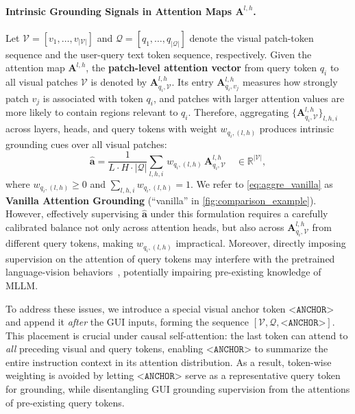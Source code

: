 \paragraph{Intrinsic Grounding Signals in Attention Maps $\mathbf{A}^{l,h}$.}
Let $\mathcal{V}=[v_1,\ldots,v_{|\mathcal{V}|}]$ and $\mathcal{Q}=[q_1,\ldots,q_{|\mathcal{Q}|}]$ denote the visual patch-token sequence and the user-query text token sequence, respectively. 
Given the attention map $\mathbf{A}^{l,h}$, the \textbf{patch-level attention vector} from query token $q_i$ to all visual patches $\mathcal{V}$ is denoted by $\mathbf{A}^{l,h}_{q_i,\mathcal{V}}$. Its entry $\mathbf{A}^{l,h}_{q_i,v_j}$ measures how strongly patch $v_j$ is associated with token $q_i$, and patches with larger attention values are more likely to contain regions relevant to $q_i$. Therefore, aggregating $\{\mathbf{A}^{l,h}_{q_i,\mathcal{V}}\}_{l,h,i}$ across layers, heads, and query tokens with weight $w_{q_i,(l,h)}$ produces intrinsic grounding cues over all visual patches:
\begin{equation}
\hat{\mathbf{a}}
= \frac{1}{L\cdot H\cdot|\mathcal{Q}|}\sum_{l,h,i}
\, w_{q_i, (l,h)}\,\mathbf{A}^{l,h}_{q_i,\mathcal{V}} \quad\in\mathbb{R}^{|\mathcal{V}|},
\label{eq:aggre_vanilla}
\end{equation}
where $w_{q_i,(l,h)}\ge 0$ and $\sum_{l,h,i} w_{q_i,(l,h)}=1$. 
We refer to \cref{eq:aggre_vanilla} as \textbf{Vanilla Attention Grounding} (``vanilla'' in \cref{fig:comparison_example}).
However, effectively supervising $\hat{\mathbf{a}}$ under this formulation requires a carefully calibrated balance not only across attention heads, but also across $\mathbf{A}^{l,h}_{q_i,\mathcal{V}}$ from different query tokens, making $w_{q_i,(l,h)}$ impractical. 
Moreover, directly imposing supervision on the attention of query tokens may interfere with the pretrained language-vision behaviors~\citep{samaran2021attending}, potentially impairing pre-existing knowledge of MLLM. 

To address these issues, we introduce a special visual anchor token $\texttt{<ANCHOR>}$ and append it \emph{after} the GUI inputs, forming the sequence $[\mathcal{V},\mathcal{Q},\texttt{<ANCHOR>}]$. 
This placement is crucial under causal self-attention: the last token can attend to \emph{all} preceding visual and query tokens, enabling $\texttt{<ANCHOR>}$ to summarize the entire instruction context in its attention distribution. 
As a result, token-wise weighting is avoided by letting $\texttt{<ANCHOR>}$ serve as a representative query token for grounding, while disentangling GUI grounding supervision from the attentions of pre-existing query tokens. 

